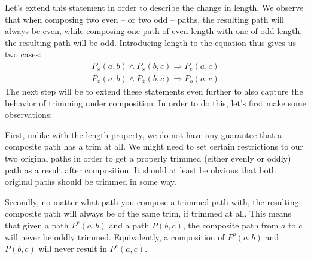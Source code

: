 Let's extend this statement in order to describe the change in length.
We observe that when composing two even -- or two odd -- paths, the resulting path will always be even, while composing one path of even length with one of odd length, the resulting path will be odd.
Introducing length to the equation thus gives us two cases:
\begin{align*}
  P_x(a,b) \wedge P_x(b,c) \Rightarrow P_e(a,c)\\
  P_x(a,b) \wedge P_{\overline{x}}(b,c) \Rightarrow P_o(a,c)
\end{align*}
The next step will be to extend these statements even further to also capture the behavior of trimming under composition.
In order to do this, let's first make some observations:

First, unlike with the length property, we do not have any guarantee that a composite path has a trim at all.
We might need to set certain restrictions to our two original paths in order to get a properly trimmed (either evenly or oddly) path as a result after composition.  It should at least be obvious that both original paths should be trimmed in some way.

Secondly, no matter what path you compose a trimmed path with, the resulting composite path will always be of the same trim, if trimmed at all.
This means that given a path $P^e(a,b)$ and a path $P(b,c)$, the composite path from $a$ to $c$ will never be oddly trimmed. Equivalently, a composition of $P^o(a,b)$ and $P(b,c)$ will never result in $P^e(a,c)$.

